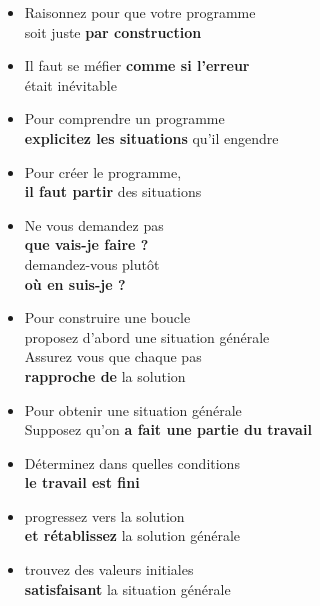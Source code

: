 {\begin{multicols}{2}
\begin{itemize}
\item Raisonnez pour que votre programme\\
	  soit juste {\bf par construction}

\item Il faut se m\'efier {\bf comme si l'erreur }\\
	  \'etait in\'evitable

\item Pour comprendre un programme\\
      {\bf explicitez les situations} qu'il engendre

\item Pour cr\'eer le programme,\\
	  {\bf il faut partir } des situations

\item Ne vous demandez pas \\
	  {\bf que vais-je faire ?}\\
	  demandez-vous plut\^ot\\
	  {\bf o\`u en suis-je ?}

\end{itemize} 


\begin{itemize} 

\item Pour construire une boucle\\
	  proposez d'abord une situation g\'en\'erale\\
	  Assurez vous que chaque pas \\
	  {\bf rapproche de } la solution

\item Pour obtenir une situation g\'en\'erale\\
	  Supposez qu'on {\bf a fait une partie du travail}

\item D\'eterminez dans quelles conditions\\
	  {\bf le travail est fini}

\item progressez vers la solution\\
	  {\bf et r\'etablissez } la solution g\'en\'erale

\item trouvez des valeurs initiales\\
	  {\bf satisfaisant } la situation g\'en\'erale


\end{itemize} 
\end{multicols}
}
